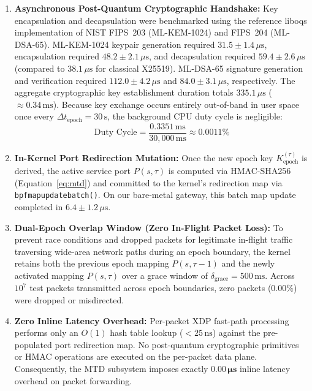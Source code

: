 \documentclass{ieeeaccess}
\renewcommand{\_}{\textunderscore\allowbreak}
\begin{document}
\begin{enumerate}
  \item \textbf{Asynchronous Post-Quantum Cryptographic Handshake:} Key encapsulation and decapsulation were benchmarked using the reference liboqs implementation of NIST FIPS~203 (ML-KEM-1024) and FIPS~204 (ML-DSA-65). ML-KEM-1024 keypair generation required $31.5 \pm 1.4\,\mu\text{s}$, encapsulation required $48.2 \pm 2.1\,\mu\text{s}$, and decapsulation required $59.4 \pm 2.6\,\mu\text{s}$ (compared to $38.1\,\mu\text{s}$ for classical X25519). ML-DSA-65 signature generation and verification required $112.0 \pm 4.2\,\mu\text{s}$ and $84.0 \pm 3.1\,\mu\text{s}$, respectively. The aggregate cryptographic key establishment duration totals $335.1\,\mu\text{s}$ (${\approx}0.34\,\text{ms}$). Because key exchange occurs entirely out-of-band in user space once every $\Delta t_{\text{epoch}} = 30\,\text{s}$, the background CPU duty cycle is negligible:
  \begin{equation}
    \text{Duty Cycle} = \frac{0.3351\,\text{ms}}{30{,}000\,\text{ms}} \approx 0.0011\%
    \label{eq:mtd_duty_cycle}
  \end{equation}

  \item \textbf{In-Kernel Port Redirection Mutation:} Once the new epoch key $K_{\text{epoch}}^{(\tau)}$ is derived, the active service port $P(s, \tau)$ is computed via HMAC-SHA256 (Equation~\ref{eq:mtd}) and committed to the kernel's redirection map via \texttt{bpf\_map\_update\_batch()}. On our bare-metal gateway, this batch map update completed in $6.4 \pm 1.2\,\mu\text{s}$.

  \item \textbf{Dual-Epoch Overlap Window (Zero In-Flight Packet Loss):} To prevent race conditions and dropped packets for legitimate in-flight traffic traversing wide-area network paths during an epoch boundary, the kernel retains both the previous epoch mapping $P(s, \tau-1)$ and the newly activated mapping $P(s, \tau)$ over a grace window of $\delta_{\text{grace}} = 500\,\text{ms}$. Across $10^7$ test packets transmitted across epoch boundaries, zero packets ($0.00\%$) were dropped or misdirected.

  \item \textbf{Zero Inline Latency Overhead:} Per-packet XDP fast-path processing performs only an $O(1)$ hash table lookup ($< 25\,\text{ns}$) against the pre-populated port redirection map. No post-quantum cryptographic primitives or HMAC operations are executed on the per-packet data plane. Consequently, the MTD subsystem imposes exactly $\mathbf{0.00\,\mu\text{s}}$ inline latency overhead on packet forwarding.
\end{enumerate}
\end{document}
